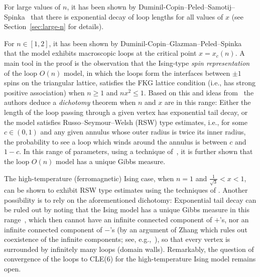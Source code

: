 \documentclass[12pt,reqno]{article}
\begin{document}
For large values of $n$, it has been shown by Duminil-Copin--Peled--Samotij--Spinka~\cite{DCPSS14} that there is exponential decay of loop lengths for all values of $x$ (see Section~\ref{sec:large-n} for details).

For $n \in [1,2]$, it has been shown by Duminil-Copin--Glazman--Peled--Spinka~\cite{macroscopicloops2017} that the model exhibits macroscopic loops at the critical point $x=x_c(n)$. A main tool in the proof is the observation that the Ising-type \emph{spin representation} of the loop $O(n)$ model, in which the loops form the interfaces between $\pm1$ spins on the triangular lattice, satisfies the FKG lattice condition (i.e., has strong positive association) when $n\ge 1$ and $nx^2\le 1$. Based on this and ideas from~\cite{DumSidTas13} the authors deduce a \emph{dichotomy} theorem when $n$ and $x$ are in this range: Either the length of the loop passing through a given vertex has exponential tail decay, or the model satisfies Russo--Seymour--Welsh (RSW) type estimates, i.e., for some $c\in(0,1)$ and any given annulus whose outer radius is twice its inner radius, the probability to see a loop which winds around the annulus is between $c$ and $1-c$. In this range of parameters, using a technique of~\cite{georgii2000percolation}, it is further shown that the loop $O(n)$ model has a unique Gibbs measure.

The high-temperature (ferromagnetic) Ising case, when $n=1$ and $\frac{1}{\sqrt{3}}<x<1$, can be shown to exhibit RSW type estimates using the techniques of \cite{tassion2016crossing}. Another possibility is to rely on the aforementioned dichotomy: Exponential tail decay can be ruled out by noting that the Ising model has a unique Gibbs measure in this range~\cite[Theorem 3.25]{friedli2016statistical}, which then cannot have an infinite connected component of $+$'s, nor an infinite connected component of $-$'s (by an argument of Zhang which rules out coexistence of the infinite components; see, e.g.,~\cite[Theorem 14.3]{haggstrom2006uniqueness}), so that every vertex is surrounded by infinitely many loops (domain walls).
Remarkably, the question of convergence of the loops to CLE(6) for the high-temperature Ising model remains open.
\end{document}
